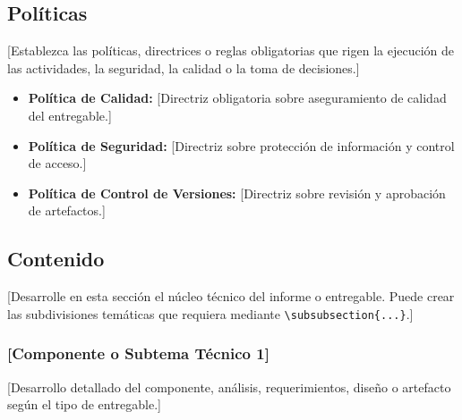 \documentclass[10pt,letterpaper]{article}
\begin{document}
\subsection{Políticas}

[Establezca las políticas, directrices o reglas obligatorias que rigen la ejecución de las actividades, la seguridad, la calidad o la toma de decisiones.]

\begin{itemize}
    \item \textbf{Política de Calidad:} [Directriz obligatoria sobre aseguramiento de calidad del entregable.]
    \item \textbf{Política de Seguridad:} [Directriz sobre protección de información y control de acceso.]
    \item \textbf{Política de Control de Versiones:} [Directriz sobre revisión y aprobación de artefactos.]
\end{itemize}

\subsection{Contenido}

[Desarrolle en esta sección el núcleo técnico del informe o entregable. Puede crear las subdivisiones temáticas que requiera mediante \texttt{\textbackslash subsubsection\{...\}}.]

\subsubsection{[Componente o Subtema Técnico 1]}

[Desarrollo detallado del componente, análisis, requerimientos, diseño o artefacto según el tipo de entregable.]

\end{document}
